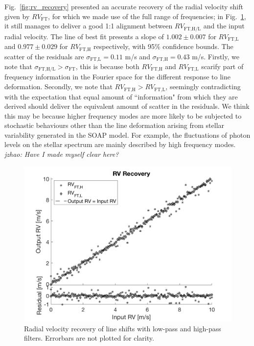 Fig.~\ref{fig:rv_recovery} presented an accurate recovery of the radial velocity shift given by $RV_\text{FT}$, for which we made use of the full range of frequencies; in Fig.~\ref{fig:rv_recovery_LH}, it still manages to deliver a good 1:1 alignment between $RV_\text{FT,H/L}$ and the input radial velocity. The line of best fit presents a slope of $1.002\pm0.007$ for $RV_\text{FT,L}$ and $0.977\pm0.029$ for $RV_\text{FT,H}$ respectively, with 95\% confidence bounds. The scatter of the residuals are $\sigma_\text{FT,L} = 0.11$ m/s and $\sigma_\text{FT,H} = 0.43$ m/s. Firstly, we note that $\sigma_\text{FT,H/L} > \sigma_\text{FT}$, this is because both $RV_\text{FT,H}$ and $RV_\text{FT,L}$ scarify part of frequency information in the Fourier space for the different response to line deformation. Secondly, we note that $RV_\text{FT,H} > RV_\text{FT,L}$, seemingly contradicting with the expectation that equal amount of ``information" from which they are derived should deliver the equivalent amount of scatter in the residuals. We think this may be because higher frequency modes are more likely to be subjected to stochastic behaviours other than the line deformation arising from stellar variability generated in the SOAP model. For example, the fluctuations of photon levels on the stellar spectrum are mainly described by high frequency modes. {\em jzhao: Have I made myself clear here?}

\begin{figure}[tbp]
\centering
\includegraphics[width = 0.7 \linewidth]
{./Figures/Methods/5-LINE_SHIFT_ONLY-HL.png}
\caption[Low-pass and high-pass radial velocities]
{Radial velocity recovery of line shifts with low-pass and high-pass filters. Errorbars are not plotted for clarity.}
\label{fig:rv_recovery_LH}
\end{figure} 
\FloatBarrier

